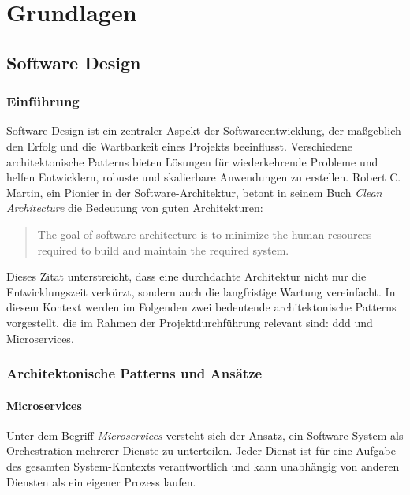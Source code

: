 \chapter{Grundlagen}

\section{Software Design}

\subsection{Einführung}

Software-Design ist ein zentraler Aspekt der Softwareentwicklung, der maßgeblich den Erfolg und die Wartbarkeit eines Projekts beeinflusst. Verschiedene architektonische Patterns bieten Lösungen für wiederkehrende Probleme und helfen Entwicklern, robuste und skalierbare Anwendungen zu erstellen. Robert C. Martin, ein Pionier in der Software-Architektur, betont in seinem Buch \textit{Clean Architecture} die Bedeutung von guten Architekturen:

\begin{quote}
The goal of software architecture is to minimize the human resources required to build and maintain the required system. \autocite{martin:clean-architecture}
\end{quote}

Dieses Zitat unterstreicht, dass eine durchdachte Architektur nicht nur die Entwicklungszeit verkürzt, sondern auch die langfristige Wartung vereinfacht. In diesem Kontext werden im Folgenden zwei bedeutende architektonische Patterns vorgestellt, die im Rahmen der Projektdurchführung relevant sind: \ac{ddd} und Microservices.

\subsection{Architektonische Patterns und Ansätze}

\subsubsection{Microservices} \label{cha:grundlagen:swdesign:microservices}

Unter dem Begriff \textit{Microservices} versteht sich der Ansatz, ein Software-System als Orchestration mehrerer Dienste zu unterteilen. Jeder Dienst ist für eine Aufgabe des gesamten System-Kontexts verantwortlich und kann unabhängig von anderen Diensten als ein eigener Prozess laufen. \autocite{LewisFowler2024}

